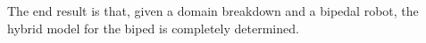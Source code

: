 The end result is that, given a domain breakdown and a bipedal robot, the hybrid
model for the biped is completely determined.
%

